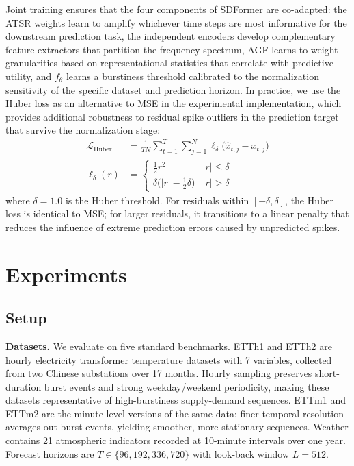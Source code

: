 \documentclass[journal]{IEEEtran}
\begin{document}
Joint training ensures that the four components of SDFormer are co-adapted:
the ATSR weights learn to amplify whichever time steps are most
informative for the downstream prediction task, the independent encoders
develop complementary feature extractors that partition the frequency
spectrum, AGF learns to weight granularities based on representational
statistics that correlate with predictive utility, and $f_\theta$ learns
a burstiness threshold calibrated to the normalization sensitivity of the
specific dataset and prediction horizon.
In practice, we use the Huber loss as an alternative to MSE in the
experimental implementation, which provides additional robustness to
residual spike outliers in the prediction target that survive the
normalization stage:
\begin{align}
\mathcal{L}_{\mathrm{Huber}} &= \frac{1}{TN}
  \sum_{t=1}^{T}\sum_{j=1}^{N} \ell_\delta\!\bigl(\hat{x}_{t,j} - x_{t,j}\bigr)
  \label{eq:huber} \\
\ell_\delta(r) &= \begin{cases}
  \tfrac{1}{2}r^2 & |r| \leq \delta \\
  \delta\bigl(|r|-\tfrac{1}{2}\delta\bigr) & |r| > \delta
\end{cases} \nonumber
\end{align}
where $\delta = 1.0$ is the Huber threshold.
For residuals within $[-\delta, \delta]$, the Huber loss is identical to
MSE; for larger residuals, it transitions to a linear penalty that reduces
the influence of extreme prediction errors caused by unpredicted spikes.

\section{Experiments}
\label{sec:experiments}

\subsection{Setup}

\textbf{Datasets.}
We evaluate on five standard benchmarks.
ETTh1 and ETTh2 are hourly electricity transformer temperature datasets
with 7 variables, collected from two Chinese substations over 17 months.
Hourly sampling preserves short-duration burst events and strong
weekday/weekend periodicity, making these datasets representative of
high-burstiness supply-demand sequences.
ETTm1 and ETTm2 are the minute-level versions of the same data; finer
temporal resolution averages out burst events, yielding smoother, more
stationary sequences.
Weather contains 21 atmospheric indicators recorded at 10-minute intervals
over one year.
Forecast horizons are $T \in \{96, 192, 336, 720\}$ with look-back window
$L = 512$.
\end{document}
